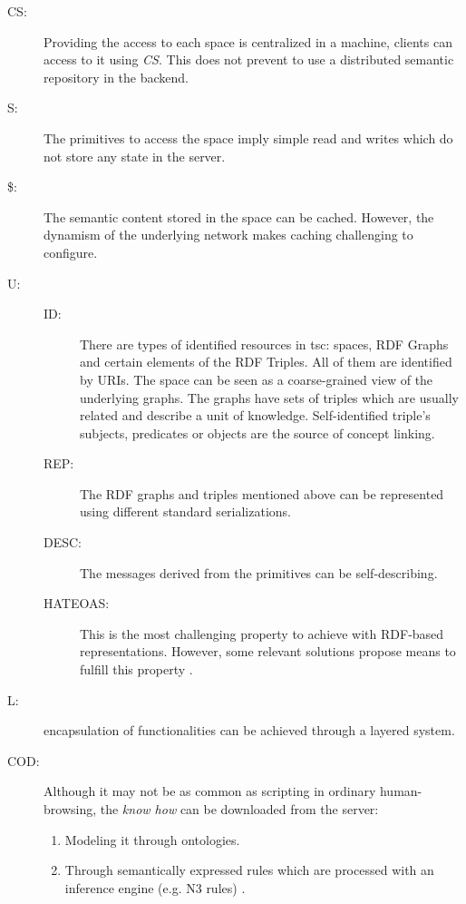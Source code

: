 \begin{description}
 \item[CS:] Providing the access to each space is centralized in a machine, clients can access to it using \emph{CS}.
           This does not prevent to use a distributed semantic repository in the backend.
 \item[S:] The primitives to access the space imply simple read and writes which do not store any state in the server.
 \item[\$:] The semantic content stored in the space can be cached.
           However, the dynamism of the underlying network makes caching challenging to configure. %
 \item[U:]
    \begin{description}
	\item[ID:] There are types of identified resources in \ac{tsc}: spaces, RDF Graphs and certain elements of the RDF Triples.
	                 All of them are identified by URIs.
	                 The space can be seen as a coarse-grained view of the underlying graphs. %
	                 The graphs have sets of triples which are usually related and describe a unit of knowledge. %
	                 Self-identified triple's subjects, predicates or objects are the source of concept linking.
	\item[REP:] The RDF graphs and triples mentioned above can be represented using different standard serializations.
	\item[DESC:] The messages derived from the primitives can be self-describing. %
	\item[HATEOAS:] This is the most challenging property to achieve with RDF-based representations.
	                      However, some relevant solutions propose means to fulfill this property \cite{verborgh_functional_2012}. %
    \end{description}
 \item[L:] encapsulation of functionalities can be achieved through a layered system.
 \item[COD:] Although it may not be as common as scripting in ordinary human-browsing, %
            the \emph{know how} can be downloaded from the server:
            \begin{enumerate}
	      \item Modeling it through ontologies.
	      \item Through semantically expressed rules which are processed with an inference engine (e.g. N3 rules) \citep{verborgh_functional_2012}.
            \end{enumerate}
\end{description}

